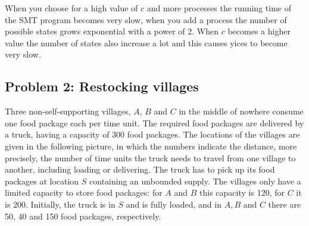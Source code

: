 \documentclass[12pt]{article}
\begin{document}

\noindent When you choose for a high value of $c$ and more processes the running time of the SMT program becomes very slow, when you add a process the number of possible states grows exponential with a power of 2. When $c$ becomes a higher value the number of states also increase a lot and this causes yices to become very slow.

\vspace{3mm}

\subsection*{Problem 2: Restocking villages}

Three non-self-supporting villages, $A$, $B$ and $C$ in the middle of nowhere consume one food package each per time unit. The required food packages are delivered by a truck, having a capacity of 300 food packages. The locations of the villages are given in the following picture, in which the numbers indicate the distance, more precisely, the number of time units the truck needs to travel from one village to another, including loading or delivering. The truck has to pick up its food packages at location $S$ containing an unbounded supply. The villages only have a limited capacity to store food packages: for $A$ and $B$ this capacity is 120, for $C$ it is 200. Initially, the truck is in $S$ and is fully loaded, and in $A, B$ and $C$ there are 50, 40 and 150 food packages, respectively.
\end{document}
